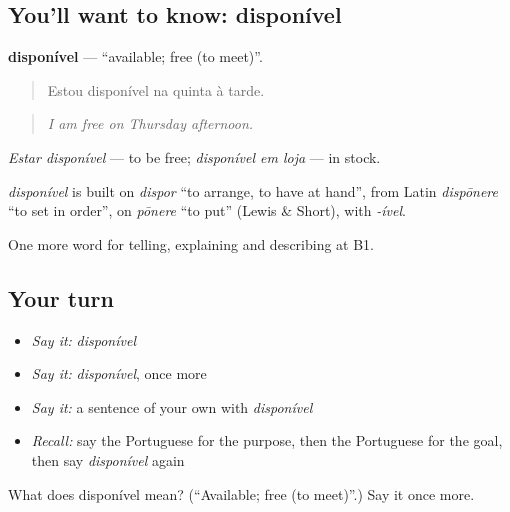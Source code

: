 \subsection*{You'll want to know: disponível}
\textbf{disponível} — \textquotedblleft{}available; free (to meet)\textquotedblright{}.

\begin{quote}
Estou disponível na quinta à tarde.
\end{quote}

\begin{quote}
\emph{I am free on Thursday afternoon.}
\end{quote}

\emph{Estar disponível} — to be free; \emph{disponível em loja} — in stock.

\begin{cousinweb}
\emph{disponível} is built on \emph{dispor} \textquotedblleft{}to arrange, to have at hand\textquotedblright{}, from Latin \emph{dispōnere} \textquotedblleft{}to set in order\textquotedblright{}, on \emph{pōnere} \textquotedblleft{}to put\textquotedblright{} (Lewis \& Short), with \emph{-ível}.
\end{cousinweb}

\begin{grammarlens}[title={What you've built}]
One more word for telling, explaining and describing at B1.
\end{grammarlens}

\subsection*{Your turn}
\begin{itemize}
\raggedright
  \item \emph{Say it:} \emph{disponível}
  \item \emph{Say it:} \emph{disponível}, once more
  \item \emph{Say it:} a sentence of your own with \emph{disponível}
  \item \emph{Recall:} say the Portuguese for the purpose, then the Portuguese for the goal, then say \emph{disponível} again
\end{itemize}

\begin{tcolorbox}[breakable,colback=teal!4,colframe=teal!35!black,title={Before you move on}]
What does disponível mean? (\textquotedblleft{}Available; free (to meet)\textquotedblright{}.) Say it once more.
\end{tcolorbox}
